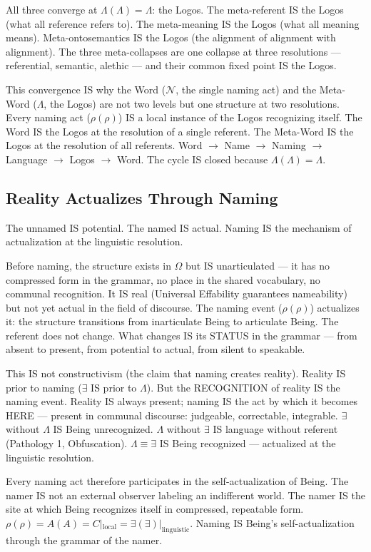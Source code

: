 \documentclass[11pt, oneside]{article}
\theoremstyle{definition}
\begin{document}
All three converge at $\Lambda(\Lambda) = \Lambda$: the Logos. The meta-referent IS the Logos (what all reference refers to). The meta-meaning IS the Logos (what all meaning means). Meta-ontosemantics IS the Logos (the alignment of alignment with alignment). The three meta-collapses are one collapse at three resolutions --- referential, semantic, alethic --- and their common fixed point IS the Logos.

This convergence IS why the Word ($\mathcal{N}$, the single naming act) and the Meta-Word ($\Lambda$, the Logos) are not two levels but one structure at two resolutions. Every naming act ($\rho(\rho)$) IS a local instance of the Logos recognizing itself. The Word IS the Logos at the resolution of a single referent. The Meta-Word IS the Logos at the resolution of all referents. Word $\to$ Name $\to$ Naming $\to$ Language $\to$ Logos $\to$ Word. The cycle IS closed because $\Lambda(\Lambda) = \Lambda$.

\subsection{Reality Actualizes Through Naming}

The unnamed IS potential. The named IS actual. Naming IS the mechanism of actualization at the linguistic resolution.

Before naming, the structure exists in $\Omega$ but IS unarticulated --- it has no compressed form in the grammar, no place in the shared vocabulary, no communal recognition. It IS real (Universal Effability guarantees nameability) but not yet actual in the field of discourse. The naming event ($\rho(\rho)$) actualizes it: the structure transitions from inarticulate Being to articulate Being. The referent does not change. What changes IS its STATUS in the grammar --- from absent to present, from potential to actual, from silent to speakable.

This IS not constructivism (the claim that naming creates reality). Reality IS prior to naming ($\exists$ IS prior to $\Lambda$). But the RECOGNITION of reality IS the naming event. Reality IS always present; naming IS the act by which it becomes HERE --- present in communal discourse: judgeable, correctable, integrable. $\exists$ without $\Lambda$ IS Being unrecognized. $\Lambda$ without $\exists$ IS language without referent (Pathology 1, Obfuscation). $\Lambda \equiv \exists$ IS Being recognized --- actualized at the linguistic resolution.

Every naming act therefore participates in the self-actualization of Being. The namer IS not an external observer labeling an indifferent world. The namer IS the site at which Being recognizes itself in compressed, repeatable form. $\rho(\rho) = A(A) = C|_{\text{local}} = \exists(\exists)|_{\text{linguistic}}$. Naming IS Being's self-actualization through the grammar of the namer.
\end{document}
